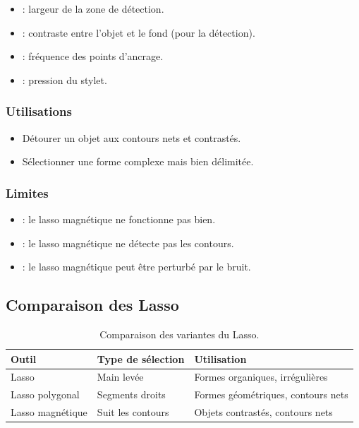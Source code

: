 \begin{itemize}
    \item {} : largeur de la zone de détection.
    \item {} : contraste entre l'objet et le fond (pour la détection).
    \item {} : fréquence des points d'ancrage.
    \item {} : pression du stylet.
\end{itemize}

\subsubsection{Utilisations}

\begin{itemize}
    \item Détourer un objet aux contours nets et contrastés.
    \item Sélectionner une forme complexe mais bien délimitée.
\end{itemize}

\subsubsection{Limites}

\begin{itemize}
    \item {} : le lasso magnétique ne fonctionne pas bien.
    \item {} : le lasso magnétique ne détecte pas les contours.
    \item {} : le lasso magnétique peut être perturbé par le bruit.
\end{itemize}

\subsection{Comparaison des Lasso}

\begin{table}[h!]
\centering
\begin{tabular}{@{}p{3.5cm}p{4cm}p{5cm}@{}}
\toprule
\textbf{Outil} & \textbf{Type de sélection} & \textbf{Utilisation} \\
\midrule
Lasso & Main levée & Formes organiques, irrégulières \\
Lasso polygonal & Segments droits & Formes géométriques, contours nets \\
Lasso magnétique & Suit les contours & Objets contrastés, contours nets \\
\bottomrule
\end{tabular}
\caption{Comparaison des variantes du Lasso.}
\end{table}

